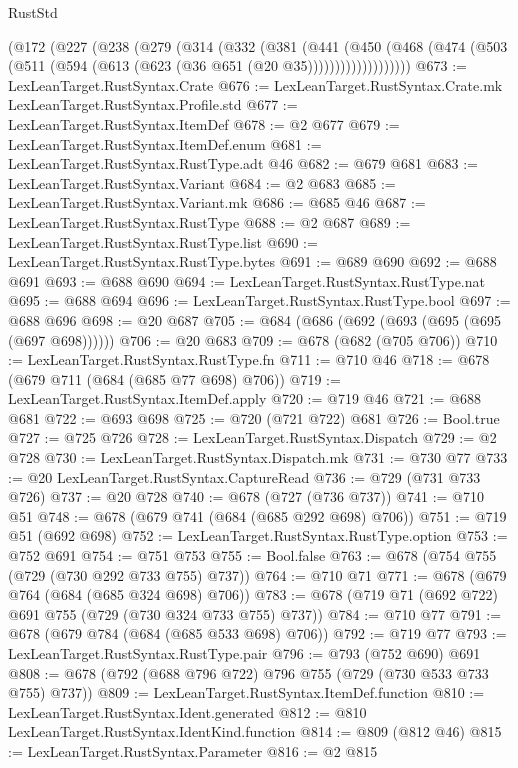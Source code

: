 \begin{lexlean}{RustStd}
\begin{coremodule}
      (@172
        (@227
          (@238
            (@279
              (@314
                (@332
                  (@381
                    (@441
                      (@450
                        (@468
                          (@474 (@503 (@511 (@594 (@613 (@623 (@36 @651 (@20 @35)))))))))))))))))))
@673 := LexLeanTarget.RustSyntax.Crate
@676 := LexLeanTarget.RustSyntax.Crate.mk LexLeanTarget.RustSyntax.Profile.std
@677 := LexLeanTarget.RustSyntax.ItemDef
@678 := @2 @677
@679 := LexLeanTarget.RustSyntax.ItemDef.enum
@681 := LexLeanTarget.RustSyntax.RustType.adt @46
@682 := @679 @681
@683 := LexLeanTarget.RustSyntax.Variant
@684 := @2 @683
@685 := LexLeanTarget.RustSyntax.Variant.mk
@686 := @685 @46
@687 := LexLeanTarget.RustSyntax.RustType
@688 := @2 @687
@689 := LexLeanTarget.RustSyntax.RustType.list
@690 := LexLeanTarget.RustSyntax.RustType.bytes
@691 := @689 @690
@692 := @688 @691
@693 := @688 @690
@694 := LexLeanTarget.RustSyntax.RustType.nat
@695 := @688 @694
@696 := LexLeanTarget.RustSyntax.RustType.bool
@697 := @688 @696
@698 := @20 @687
@705 := @684 (@686 (@692 (@693 (@695 (@695 (@697 @698))))))
@706 := @20 @683
@709 := @678 (@682 (@705 @706))
@710 := LexLeanTarget.RustSyntax.RustType.fn
@711 := @710 @46
@718 := @678 (@679 @711 (@684 (@685 @77 @698) @706))
@719 := LexLeanTarget.RustSyntax.ItemDef.apply
@720 := @719 @46
@721 := @688 @681
@722 := @693 @698
@725 := @720 (@721 @722) @681
@726 := Bool.true
@727 := @725 @726
@728 := LexLeanTarget.RustSyntax.Dispatch
@729 := @2 @728
@730 := LexLeanTarget.RustSyntax.Dispatch.mk
@731 := @730 @77
@733 := @20 LexLeanTarget.RustSyntax.CaptureRead
@736 := @729 (@731 @733 @726)
@737 := @20 @728
@740 := @678 (@727 (@736 @737))
@741 := @710 @51
@748 := @678 (@679 @741 (@684 (@685 @292 @698) @706))
@751 := @719 @51 (@692 @698)
@752 := LexLeanTarget.RustSyntax.RustType.option
@753 := @752 @691
@754 := @751 @753
@755 := Bool.false
@763 := @678 (@754 @755 (@729 (@730 @292 @733 @755) @737))
@764 := @710 @71
@771 := @678 (@679 @764 (@684 (@685 @324 @698) @706))
@783 := @678 (@719 @71 (@692 @722) @691 @755 (@729 (@730 @324 @733 @755) @737))
@784 := @710 @77
@791 := @678 (@679 @784 (@684 (@685 @533 @698) @706))
@792 := @719 @77
@793 := LexLeanTarget.RustSyntax.RustType.pair
@796 := @793 (@752 @690) @691
@808 := @678 (@792 (@688 @796 @722) @796 @755 (@729 (@730 @533 @733 @755) @737))
@809 := LexLeanTarget.RustSyntax.ItemDef.function
@810 := LexLeanTarget.RustSyntax.Ident.generated
@812 := @810 LexLeanTarget.RustSyntax.IdentKind.function
@814 := @809 (@812 @46)
@815 := LexLeanTarget.RustSyntax.Parameter
@816 := @2 @815

\end{coremodule}
\end{lexlean}
